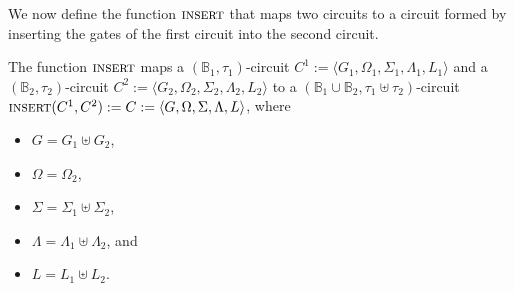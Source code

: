 \documentclass[../paper.tex]{subfiles}
\begin{document}


We now define the function ${\normalfont\textsc{insert}}$ that maps two circuits to a circuit
formed by inserting the gates of the first circuit into the second circuit.

\begin{definition}
  The function ${\normalfont\textsc{insert}}$ maps a $(\mathbb{B}_1, \tau_1)$-circuit $C^1 :=
  \langle G_1, \Omega_1, \Sigma_1 , \Lambda_1, L_1 \rangle$ and a
  $(\mathbb{B}_2, \tau_2)$-circuit $C^2 := \langle G_2, \Omega_2, \Sigma_2 ,
  \Lambda_2, L_2 \rangle$ to a $(\mathbb{B}_1 \cup \mathbb{B}_2, \tau_1 \uplus
  \tau_2)$-circuit ${\normalfont\textsc{insert}}(C^1, C^2) := C := \langle G, \Omega, \Sigma ,
  \Lambda, L \rangle$, where
  \begin{itemize}
    \setlength\itemsep{0mm}
  \item $G = G_1 \uplus G_2$,
  \item $\Omega = \Omega_2$,
  \item $\Sigma = \Sigma_1 \uplus \Sigma_2$,
  \item $\Lambda = \Lambda_1 \uplus \Lambda_2$, and
  \item $L = L_1 \uplus L_2$.
  \end{itemize}
\end{definition}
\end{document}
